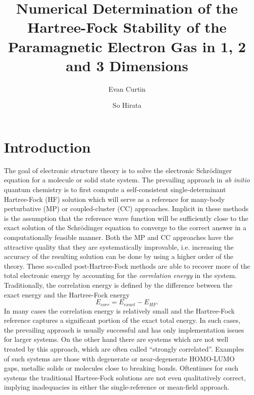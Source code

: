 \documentclass[preprint, journal=prl]{revtex4-1}
\begin{document}
\title{Numerical Determination of the Hartree-Fock Stability of the Paramagnetic Electron Gas in 1, 2 and 3 Dimensions}
\author{Evan Curtin}
\author{So Hirata}

\begin{abstract}
    
\end{abstract}

\maketitle

\section{Introduction}
  The goal of electronic structure theory is to solve the electronic Schr{\"o}dinger equation  for a molecule or solid state system. The prevailing approach in \emph{ab initio} quantum  chemistry is to first compute a self-consistent single-determinant Hartree-Fock (HF) solution which will serve as a reference for many-body perturbative (MP) or coupled-cluster (CC) approaches. Implicit in these methods is the assumption that the reference wave function will be sufficiently close to the exact solution of the Schr{\"o}dinger equation to converge to the correct answer in a computationally feasible manner. Both the MP and CC approaches have the attractive quality that they are systematically improvable, i.e. increasing the accuracy of the resulting solution can be done by using a higher order of the theory. These so-called post-Hartree-Fock methods are able to recover more of the total electronic energy by accounting for the \emph{correlation energy} in the system. Traditionally, the correlation energy is defined by the difference between the exact energy and the Hartree-Fock energy \cite{Shavitt2009}
  \begin{equation}\label{eq:correlation_energy}
    E_{corr} = E_{exact} -  E_{HF}.
  \end{equation}
  In many cases the correlation energy is relatively small and the Hartree-Fock reference captures a significant portion of the exact total energy. In such cases, the prevailing approach is usually successful and has only implementation issues for larger systems. On the other hand there are systems which are not well treated by this approach, which are often called ``strongly correlated''. Examples of such systems are those with degenerate or near-degenerate HOMO-LUMO gaps, metallic solids or molecules close to breaking bonds. Oftentimes for such systems the traditional Hartree-Fock solutions are not even qualitatively correct, implying inadequacies in either the single-reference or mean-field approach.    
  
\end{document}
